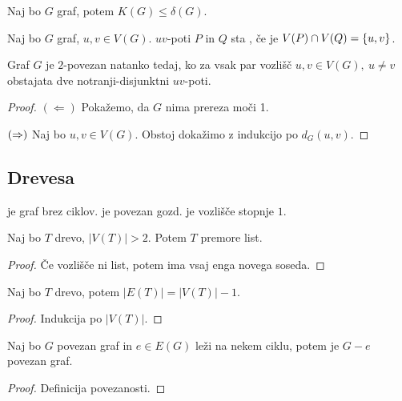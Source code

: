 \begin{opomba}
    Naj bo $G$ graf, potem $K(G) \leq \delta(G)$.
\end{opomba}

\begin{definicija}
    Naj bo $G$ graf, $u,v \in V(G)$. $uv$-poti $P$ in $Q$ sta , če je $V(P) \cap V(Q) = \left\{u,v\right\}$.
\end{definicija}

\begin{izrek}[Whitney]
    Graf $G$ je $2$-povezan natanko tedaj, ko za vsak par vozlišč $u, v \in V(G), \ u \neq v$ obstajata dve notranji-disjunktni $uv$-poti.
\end{izrek}

\begin{proof}
    $(\Leftarrow)$ Pokažemo, da $G$ nima prereza moči 1.

    $(\Rightarrow)$ Naj bo $u,v \in V(G)$. Obstoj dokažimo z indukcijo po $d_G(u,v)$.
\end{proof}

\subsection{Drevesa}
\begin{definicija}
     je graf brez ciklov.  je povezan gozd.  je vozlišče stopnje $1$.
\end{definicija}

\begin{lema}
    Naj bo $T$ drevo, $|V(T)| > 2$. Potem $T$ premore list.
\end{lema}

\begin{proof}
    Če vozlišče ni list, potem ima vsaj enga novega soseda.
\end{proof}

\begin{lema}
    Naj bo $T$ drevo, potem $|E(T)| = |V(T)| - 1$.
\end{lema}

\begin{proof}
    Indukcija po $|V(T)|$.
\end{proof}

\begin{lema}
    Naj bo $G$ povezan graf in $e \in E(G)$ leži na nekem ciklu, potem je $G-e$ povezan graf.
\end{lema}

\begin{proof}
    Definicija povezanosti.
\end{proof}

